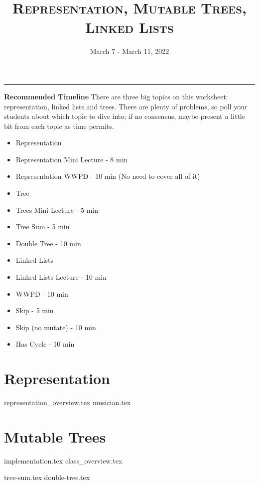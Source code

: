 \documentclass{exam}
\title{\textsc{Representation, Mutable Trees, Linked Lists}}
\date{March 7 - March 11, 2022}
\begin{document}
\maketitle
\rule{\textwidth}{0.15em}
\fontsize{12}{15}\selectfont

\begin{guide}
\textbf{Recommended Timeline}
\newline
There are three big topics on this worksheet: representation, linked lists and trees. There are plenty of problems,
so poll your students about which topic to dive into; if no consensus, maybe present a little bit from each topic as time permits.
    \begin{itemize}
        \item Representation
            \item Representation Mini Lecture - 8 min
            \item Representation WWPD - 10 min (No need to cover all of it)
        \item Tree
            \item Trees Mini Lecture - 5 min
            \item Tree Sum - 5 min
            \item Double Tree - 10 min
        \item Linked Lists
            \item Linked Lists Lecture - 10 min
            \item WWPD - 10 min
            \item Skip - 5 min
            \item Skip (no mutate) - 10 min
            \item Has Cycle - 10 min
    \end{itemize}
\vspace{.5cm}
\end{guide}

\section{Representation}
\begin{questions}
{representation_overview.tex}
{musician.tex}
\end{questions}

\newpage
\section{Mutable Trees}
{implementation.tex}
{class_overview.tex}
\vspace{\baselineskip}
\begin{questions}
{tree-sum.tex}
\newpage
{double-tree.tex}
\end{questions}
\end{document}
